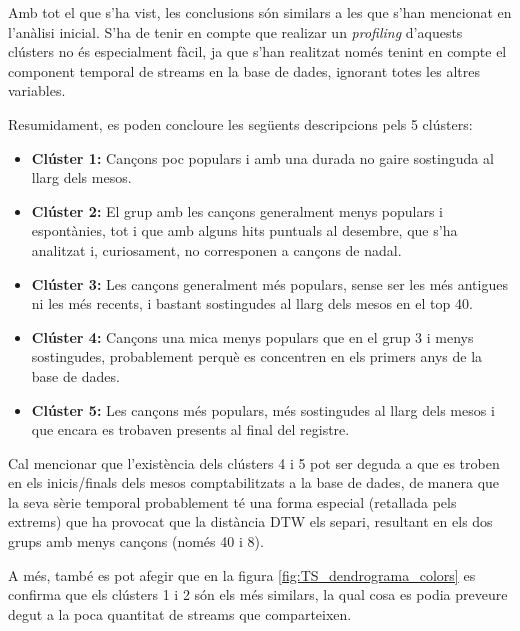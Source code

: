 \documentclass{article}
\begin{document}
Amb tot el que s'ha vist, les conclusions són similars a les que s'han mencionat en l'anàlisi inicial. S'ha de tenir en compte que realizar un \textit{profiling} d'aquests clústers no és especialment fàcil, ja que s'han realitzat només tenint en compte el component temporal de streams en la base de dades, ignorant totes les altres variables.

Resumidament, es poden concloure les següents descripcions pels 5 clústers:
\begin{itemize}
    \item \textbf{Clúster 1:} Cançons poc populars i amb una durada no gaire sostinguda al llarg dels mesos.
    
    \item \textbf{Clúster 2:} El grup amb les cançons generalment menys populars i espontànies, tot i que amb alguns hits puntuals al desembre, que s'ha analitzat i, curiosament, no corresponen a cançons de nadal.
    
    \item \textbf{Clúster 3:} Les cançons generalment més populars, sense ser les més antigues ni les més recents, i bastant sostingudes al llarg dels mesos en el top 40.
    
    \item \textbf{Clúster 4:} Cançons una mica menys populars que en el grup 3 i menys sostingudes, probablement perquè es concentren en els primers anys de la base de dades.
    
    \item \textbf{Clúster 5:} Les cançons més populars, més sostingudes al llarg dels mesos i que encara es trobaven presents al final del registre.
\end{itemize}

Cal mencionar que l'existència dels clústers 4 i 5 pot ser deguda a que es troben en els inicis/finals dels mesos comptabilitzats a la base de dades, de manera que la seva sèrie temporal probablement té una forma especial (retallada pels extrems) que ha provocat que la distància DTW els separi, resultant en els dos grups amb menys cançons (només 40 i 8).

A més, també es pot afegir que en la figura \ref{fig:TS_dendrograma_colors} es confirma que els clústers 1 i 2 són els més similars, la qual cosa es podia preveure degut a la poca quantitat de streams que comparteixen.
\end{document}
